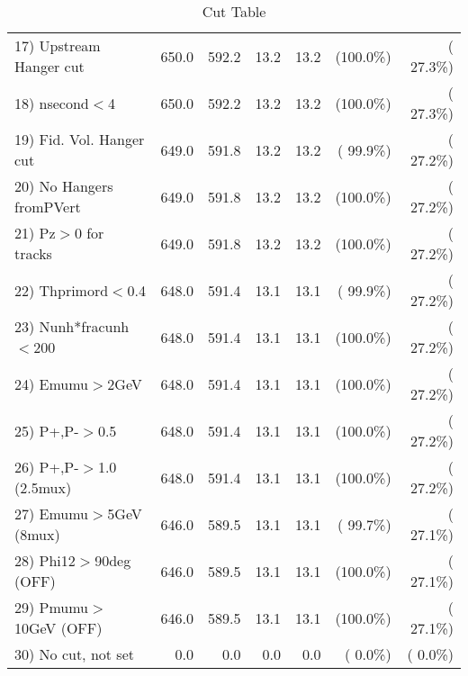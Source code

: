 \begin{table}[h!]
\begin{tabular}{||l||r|r|r|r|r|r||}
 17) Upstream Hanger cut  &        650.0 &        592.2 &         13.2 &         13.2 & (100.0\%) & ( 27.3\%) \\
 18) nsecond$<$4          &        650.0 &        592.2 &         13.2 &         13.2 & (100.0\%) & ( 27.3\%) \\
 19) Fid. Vol. Hanger cut &        649.0 &        591.8 &         13.2 &         13.2 & ( 99.9\%) & ( 27.2\%) \\
 20) No Hangers fromPVert &        649.0 &        591.8 &         13.2 &         13.2 & (100.0\%) & ( 27.2\%) \\
 21) Pz$>$0 for tracks    &        649.0 &        591.8 &         13.2 &         13.2 & (100.0\%) & ( 27.2\%) \\
 22) Thprimord$<$0.4      &        648.0 &        591.4 &         13.1 &         13.1 & ( 99.9\%) & ( 27.2\%) \\
 23) Nunh*fracunh$<$200   &        648.0 &        591.4 &         13.1 &         13.1 & (100.0\%) & ( 27.2\%) \\
 24) Emumu$>$2GeV         &        648.0 &        591.4 &         13.1 &         13.1 & (100.0\%) & ( 27.2\%) \\
 25) P+,P-$>$0.5          &        648.0 &        591.4 &         13.1 &         13.1 & (100.0\%) & ( 27.2\%) \\
 26) P+,P-$>$1.0 (2.5mux) &        648.0 &        591.4 &         13.1 &         13.1 & (100.0\%) & ( 27.2\%) \\
 27) Emumu$>$5GeV  (8mux) &        646.0 &        589.5 &         13.1 &         13.1 & ( 99.7\%) & ( 27.1\%) \\
 28) Phi12$>$90deg  (OFF) &        646.0 &        589.5 &         13.1 &         13.1 & (100.0\%) & ( 27.1\%) \\
 29) Pmumu$>$10GeV  (OFF) &        646.0 &        589.5 &         13.1 &         13.1 & (100.0\%) & ( 27.1\%) \\
 30) No cut, not set      &          0.0 &          0.0 &          0.0 &          0.0 & (  0.0\%) & (  0.0\%) \\
 \hline
 \hline
 \end{tabular}
 \caption{Cut Table           }
 \label{tab-cutheavy_neutrino_2.000}
 \end{table}
